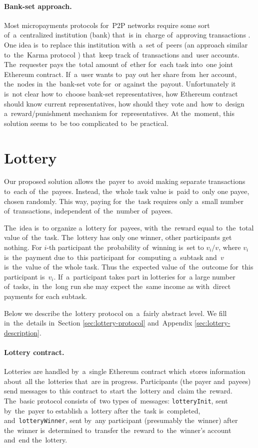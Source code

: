 \documentclass[a4paper]{article}
\begin{document}
    \paragraph{Bank-set approach.}
    Most micropayments protocols for~P2P networks require some sort of~a~centralized institution (bank) that~is
    in~charge of~approving transactions \cite{JAIN}. One idea is~to replace this institution with~a~set of~peers
    (an approach similar to~the~Karma protocol \cite{VISHNUMURTHY}) that~keep track of~transactions and~user accounts.
    The~requester pays the~total amount of~ether for~each task into~one joint Ethereum contract.
    If~a~user wants to~pay out her share from~her account, the~nodes in~the~bank-set vote for~or against the~payout.
    Unfortunately it is~not clear how to~choose bank-set representatives, how Ethereum contract should know
    current representatives, how should they vote and~how to~design a~reward/punishment mechanism
    for~representatives. At the~moment, this solution seems to~be too complicated to~be practical.

\section{Lottery}
\label{sec:lottery}

    Our proposed solution allows the~payer to~avoid making separate transactions to~each of~the~payees. Instead,
    the~whole task value is~paid to~only one payee, chosen randomly. This way, paying for~the~task requires only
    a~small number of~transactions, independent of~the~number of~payees.

    The~idea is~to organize a~lottery for~payees, with~the~reward equal to~the~total value of~the~task. The~lottery
    has only one winner, other participants get nothing. For $i$-th participant the~probability of~winning is~set to
    $v_i/v$, where $v_i$ is~the~payment due to~this participant for~computing a~subtask and~$v$ is~the~value of~the
    whole task. Thus the~expected value of~the~outcome for~this participant is~$v_i$. If~a~participant takes part in
    lotteries for~a large number of~tasks, in~the~long run she may expect the~same income as with~direct payments for
    each subtask.

    Below we describe the~lottery protocol on~a~fairly abstract level. We fill in~the~details in~Section
    \ref{sec:lottery-protocol} and~Appendix \ref{sec:lottery-description}.

    \paragraph{Lottery contract.}
    Lotteries are handled by~a~single Ethereum contract which~stores information about~all the~lotteries that~are in
    progress. Participants (the payer and~payees) send messages to~this contract to~start the~lottery and~claim
    the~reward. The~basic protocol consists of~two types of~messages: \texttt{lotteryInit}, sent by~the~payer to
    establish a~lottery after the~task is~completed, and~\texttt{lotteryWinner}, sent by~any participant
    (presumably the~winner) after the~winner is~determined to~transfer the~reward to~the~winner's account and~end
    the~lottery.
\end{document}
